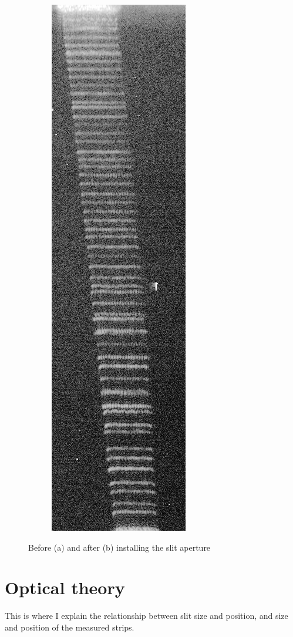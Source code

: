 \documentclass[10pt]{book}
\begin{document}
\begin{figure}[h]
\begin{subfigure}[b]{0.4\textwidth}
        \includegraphics[height=0.6\textheight]{img/slitted.jpg}
        \caption{}
    \end{subfigure}
    \caption{Before (a) and after (b) installing the slit aperture}
    \label{fig:globalsizing}
\end{figure}

\section{Optical theory}
This is where I explain the relationship between slit size and position, and
size and position of the measured strips.
\end{document}
